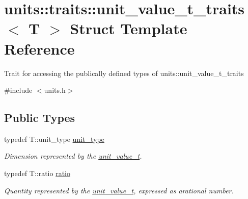 \hypertarget{structunits_1_1traits_1_1unit__value__t__traits}{}\section{units\+:\+:traits\+:\+:unit\+\_\+value\+\_\+t\+\_\+traits$<$ T $>$ Struct Template Reference}
\label{structunits_1_1traits_1_1unit__value__t__traits}


Trait for accessing the publically defined types of {\ttfamily units\+::unit\+\_\+value\+\_\+t\+\_\+traits}  




{\ttfamily \#include $<$units.\+h$>$}

\subsection*{Public Types}
\begin{DoxyCompactItemize}
\item 
\hypertarget{structunits_1_1traits_1_1unit__value__t__traits_a55b452f45b9191f73feda1a511376a6f}{}typedef T\+::unit\+\_\+type \hyperlink{structunits_1_1traits_1_1unit__value__t__traits_a55b452f45b9191f73feda1a511376a6f}{unit\+\_\+type}\label{structunits_1_1traits_1_1unit__value__t__traits_a55b452f45b9191f73feda1a511376a6f}

\begin{DoxyCompactList}\small\item\em Dimension represented by the {\ttfamily \hyperlink{structunits_1_1unit__value__t}{unit\+\_\+value\+\_\+t}}. \end{DoxyCompactList}\item 
\hypertarget{structunits_1_1traits_1_1unit__value__t__traits_a5de23dc20fe6d20e8255f42acce78efa}{}typedef T\+::ratio \hyperlink{structunits_1_1traits_1_1unit__value__t__traits_a5de23dc20fe6d20e8255f42acce78efa}{ratio}\label{structunits_1_1traits_1_1unit__value__t__traits_a5de23dc20fe6d20e8255f42acce78efa}

\begin{DoxyCompactList}\small\item\em Quantity represented by the {\ttfamily \hyperlink{structunits_1_1unit__value__t}{unit\+\_\+value\+\_\+t}}, expressed as arational number. \end{DoxyCompactList}\end{DoxyCompactItemize}


